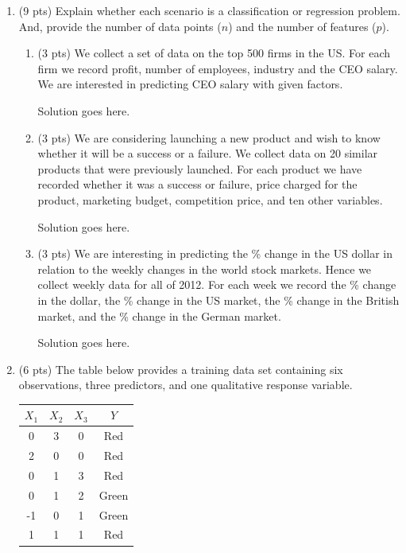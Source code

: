 \documentclass[a4paper]{article}
\theoremstyle{definition}
\newenvironment{soln}{
    \leavevmode\color{blue}\ignorespaces
}{}
\begin{document}
\begin{enumerate}
\item (9 pts) Explain whether each scenario is a classification or regression problem. And, provide the number of data points ($n$) and the number of features ($p$).

\begin{enumerate}
	\item (3 pts) We collect a set of data on the top 500 firms in the US. For each firm we record profit, number of employees, industry and the CEO salary. We are interested in predicting CEO salary with given factors.
	
	\begin{soln}  Solution goes here. \end{soln}
	
	\item (3 pts) We are considering launching a new product and wish to know whether it will be a success or a failure. We collect data on 20 similar products that were previously launched. For each product we have recorded whether it was a success or failure, price charged for the product, marketing budget, competition price, and ten other variables.
	
	\begin{soln}  Solution goes here. \end{soln}
	
	\item (3 pts) We are interesting in predicting the \% change in the US dollar in relation to the weekly changes in the world stock markets. Hence we collect weekly data for all of 2012. For each week we record the \% change in the dollar, the \% change in the US market, the \% change in the British market, and the \% change in the German market.
	
	\begin{soln}  Solution goes here. \end{soln}
	
\end{enumerate}

\item (6 pts) The table below provides a training data set containing six observations, three predictors, and one qualitative response variable.

\begin{center}
	\begin{tabular}{ c  c  c  c}
		\hline
		$X_{1}$ & $X_{2}$ & $X_{3}$ & $Y$ \\ \hline
		0 & 3 & 0 & Red \\
		2 & 0 & 0 & Red \\
		0 & 1 & 3 & Red \\
		0 & 1 & 2 & Green \\
		-1 & 0 & 1 & Green \\
		1 & 1 & 1 & Red  \\
		\hline
	\end{tabular}
\end{center}


\end{enumerate}
\end{document}
